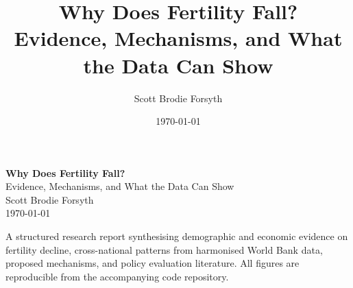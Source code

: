 \documentclass[11pt,a4paper,openany]{book}
\title{Why Does Fertility Fall?\\[0.4em]
  \large Evidence, Mechanisms, and What the Data Can Show}
\author{Scott Brodie Forsyth}
\date{\today}
\begin{document}
\frontmatter
\begin{titlepage}
  \centering
  \vspace*{2cm}
  {\LARGE\bfseries Why Does Fertility Fall?\\[0.5em]}
  {\Large Evidence, Mechanisms, and What the Data Can Show\\[2em]}
  {\large Scott Brodie Forsyth\\[3em]}
  {\large \today\\[4em]}
  \begin{minipage}{0.85\textwidth}
    \small
    A structured research report synthesising demographic and economic evidence on fertility decline, cross-national patterns from harmonised World Bank data, proposed mechanisms, and policy evaluation literature. All figures are reproducible from the accompanying code repository.
  \end{minipage}
\end{titlepage}
\end{document}
